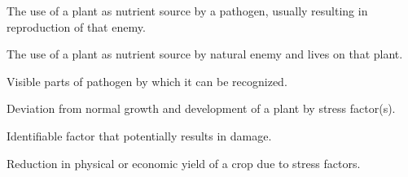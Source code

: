 \documentclass[11pt,dvipsnames,ignorenonframetext,aspectratio=169]{beamer}
\newcommand{\ecolumns}{\end{columns}}
\begin{document}

\begin{frame}{}
\protect\hypertarget{section-1}{}
\begin{description}
\small
\item[Infection] The use of a plant as nutrient source by a pathogen, usually resulting in reproduction of that enemy.
\item[Infestation] The use of a plant as nutrient source by natural enemy and lives on that plant.
\item[Sign] Visible parts of pathogen by which it can be recognized.
\item[Symptom] Deviation from normal growth and development of a plant by stress factor(s).
\item[Stress factor] Identifiable factor that potentially results in damage.
\item[Damage] Reduction in physical or economic yield of a crop due to stress factors.
\end{description}
\end{frame}
\end{document}
